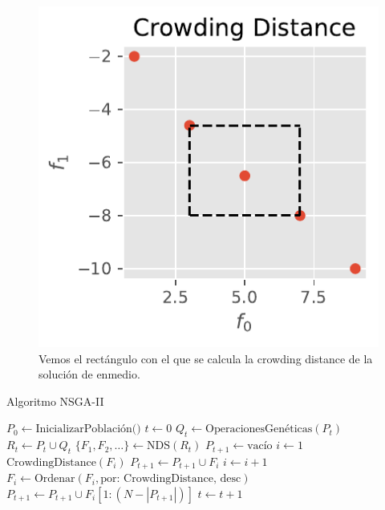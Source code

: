 \begin{figure}[H]
    \centering
    \includegraphics[scale=1]{./Figuras/crowding_distance.pdf}
    \caption{Vemos el rectángulo con el que se calcula la crowding distance de la solución de enmedio.}
    \label{fig:crowding_distance}
\end{figure}

\begin{algorithm}
    \caption{Algoritmo NSGA-II}
    \begin{algorithmic}[1]
    \setlength{\itemsep}{1pt} %
\setlength{\parskip}{0pt} %
    \State $P_0 \gets \text{InicializarPoblación()}$
    \State $t \gets 0$
        \State $Q_t \gets \text{OperacionesGenéticas}(P_t)$
        \State $R_t \gets P_t \cup Q_t$
        \State $\{F_1, F_2, \ldots\} \gets \text{NDS}(R_t)$
        \State $P_{t+1} \gets \text{vacío}$
        \State $i \gets 1$
            \State $\text{CrowdingDistance}(F_i)$
            \State $P_{t+1} \gets P_{t+1} \cup F_i$
            \State $i \gets i + 1$
        \EndWhile
        \State $F_i \gets \text{Ordenar}(F_i, \text{por: CrowdingDistance, desc})$
        \State $P_{t+1} \gets P_{t+1} \cup F_i[1:(N - |P_{t+1}|)]$
        \State $t \gets t + 1$
    \EndWhile
    \end{algorithmic}
\end{algorithm}

